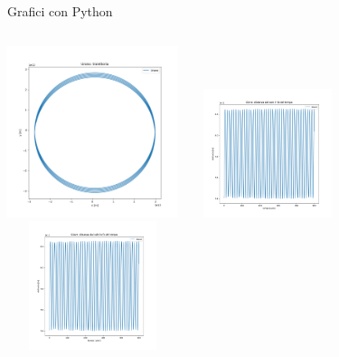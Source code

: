         \begin{frame}{Grafici con Python}
            \begin{columns}
                    \centering        
                    \includegraphics[width=5cm,height=5cm]{5_distanza/ura_orbita.png}      
                    \centering        
                    \includegraphics[width=5cm,height=3.75cm]{5_distanza/gio_osc_500_bello.png}\\
                    \includegraphics[width=5cm,height=3.75cm]{5_distanza/gio_osc_500_bello.png} 
            \end{columns}
        \end{frame}